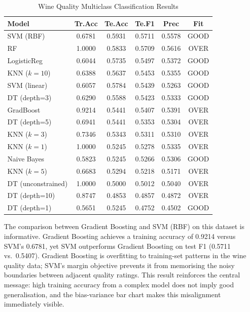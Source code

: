 \documentclass[conference]{IEEEtran}
\begin{document}
\begin{table}[t]
    \caption{Wine Quality Multiclass Classification Results}
    \label{tab:winequality}
    \centering
    \small
    \renewcommand{\arraystretch}{1.3}
    \begin{tabular}{|>{\raggedright\arraybackslash}p{1.0in}|c|c|c|c|c|}
    \hline
    \textbf{Model} & \textbf{Tr.Acc} & \textbf{Te.Acc} & \textbf{Te.F1} & \textbf{Prec} & \textbf{Fit} \\
    \hline
    SVM (RBF)      & 0.6781 & 0.5931 & 0.5711 & 0.5578 & GOOD \\
    \hline
    RF             & 1.0000 & 0.5833 & 0.5709 & 0.5616 & OVER \\
    \hline
    LogisticReg    & 0.6044 & 0.5735 & 0.5497 & 0.5372 & GOOD \\
    \hline
    KNN ($k=10$)   & 0.6388 & 0.5637 & 0.5453 & 0.5355 & GOOD \\
    \hline
    SVM (linear)   & 0.6057 & 0.5784 & 0.5439 & 0.5263 & GOOD \\
    \hline
    DT (depth=3)   & 0.6290 & 0.5588 & 0.5423 & 0.5333 & GOOD \\
    \hline
    GradBoost      & 0.9214 & 0.5441 & 0.5407 & 0.5391 & OVER \\
    \hline
    DT (depth=5)   & 0.6941 & 0.5441 & 0.5353 & 0.5304 & OVER \\
    \hline
    KNN ($k=3$)    & 0.7346 & 0.5343 & 0.5311 & 0.5310 & OVER \\
    \hline
    KNN ($k=1$)    & 1.0000 & 0.5245 & 0.5278 & 0.5335 & OVER \\
    \hline
    Naive Bayes    & 0.5823 & 0.5245 & 0.5266 & 0.5306 & GOOD \\
    \hline
    KNN ($k=5$)    & 0.6683 & 0.5294 & 0.5218 & 0.5171 & OVER \\
    \hline
    DT (unconstrained)& 1.0000 & 0.5000 & 0.5012 & 0.5040 & OVER \\
    \hline
    DT (depth=10)  & 0.8747 & 0.4853 & 0.4857 & 0.4872 & OVER \\
    \hline
    DT (depth=1)   & 0.5651 & 0.5245 & 0.4752 & 0.4502 & GOOD \\
    \hline
    \end{tabular}
\end{table}

The comparison between Gradient Boosting and SVM (RBF) on this dataset is informative. Gradient Boosting achieves a training accuracy of 0.9214 versus SVM's 0.6781, yet SVM outperforms Gradient Boosting on test F1 (0.5711 vs.\ 0.5407). Gradient Boosting is overfitting to training-set patterns in the wine quality data; SVM's margin objective prevents it from memorising the noisy boundaries between adjacent quality ratings. This result reinforces the central message: high training accuracy from a complex model does not imply good generalisation, and the bias-variance bar chart makes this misalignment immediately visible.
\end{document}
